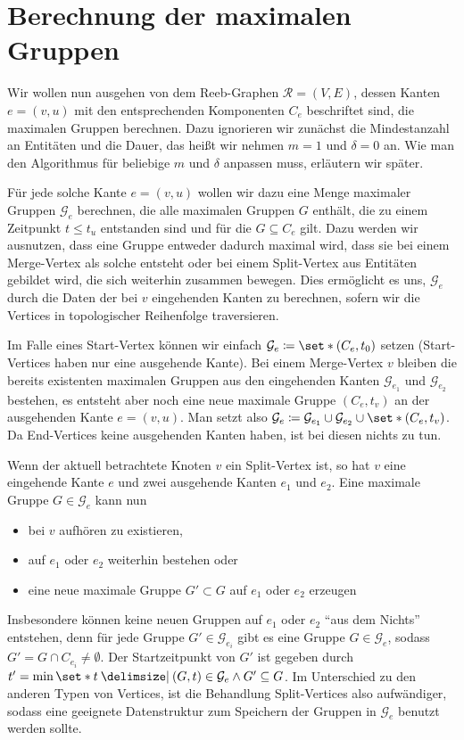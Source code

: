 \section{Berechnung der maximalen Gruppen} %
\label{sec:berechnung_maximale_gruppen}
Wir wollen nun ausgehen von dem Reeb-Graphen $\mathcal{R}=(V,E)$, dessen Kanten $e=(v,u)$ mit den entsprechenden Komponenten $C_e$ beschriftet sind, die maximalen Gruppen berechnen.
Dazu ignorieren wir zunächst die Mindestanzahl an Entitäten und die Dauer, das heißt wir nehmen $m=1$ und $\delta=0$ an.
Wie man den Algorithmus für beliebige $m$ und $\delta$ anpassen muss, erläutern wir später.

Für jede solche Kante $e=(v,u)$ wollen wir dazu eine Menge maximaler Gruppen $\mathcal{G}_e$ berechnen, die alle maximalen Gruppen $G$ enthält, die zu einem Zeitpunkt $t \le t_u$ entstanden sind und für die $G \subseteq C_e$ gilt.
Dazu werden wir ausnutzen, dass eine Gruppe entweder dadurch maximal wird, dass sie bei einem Merge-Vertex als solche entsteht oder bei einem Split-Vertex aus Entitäten gebildet wird, die sich weiterhin zusammen bewegen.
Dies ermöglicht es uns, $\mathcal{G}_e$ durch die Daten der bei $v$ eingehenden Kanten zu berechnen, sofern wir die Vertices in topologischer Reihenfolge traversieren.

Im Falle eines Start-Vertex können wir einfach $\mathcal{G}_e \coloneqq \set*{(C_e,t_0)}$ setzen (Start-Vertices haben nur eine ausgehende Kante).
Bei einem Merge-Vertex $v$ bleiben die bereits existenten maximalen Gruppen aus den eingehenden Kanten $\mathcal{G}_{e_1}$ und $\mathcal{G}_{e_2}$ bestehen, es entsteht aber noch eine neue maximale Gruppe $(C_e,t_v)$ an der ausgehenden Kante $e=(v,u)$.
Man setzt also $\mathcal{G}_e \coloneqq \mathcal{G}_{e_1} \cup \mathcal{G}_{e_2} \cup \set*{(C_e,t_v)}$.
Da End-Vertices keine ausgehenden Kanten haben, ist bei diesen nichts zu tun.

Wenn der aktuell betrachtete Knoten $v$ ein Split-Vertex ist, so hat $v$ eine eingehende Kante $e$ und zwei ausgehende Kanten $e_1$ und $e_2$.
Eine maximale Gruppe $G \in \mathcal{G}_e$ kann nun
\begin{itemize}
	\item bei $v$ aufhören zu existieren,
	\item auf $e_1$ oder $e_2$ weiterhin bestehen oder
	\item eine neue maximale Gruppe $G' \subset G$ auf $e_1$ oder $e_2$ erzeugen
\end{itemize}
Insbesondere können keine neuen Gruppen auf $e_1$ oder $e_2$ \enquote{aus dem Nichts} entstehen, denn für jede Gruppe $G' \in \mathcal{G}_{e_i}$ gibt es eine Gruppe $G \in \mathcal{G}_e$, sodass $G' = G \cap C_{e_i} \neq \emptyset$.
Der Startzeitpunkt von $G'$ ist gegeben durch $t' = \min \set*{t \given (G,t) \in \mathcal{G}_e \wedge G' \subseteq G}$.
Im Unterschied zu den anderen Typen von Vertices, ist die Behandlung Split-Vertices also aufwändiger, sodass eine geeignete Datenstruktur zum Speichern der Gruppen in $\mathcal{G}_e$ benutzt werden sollte.

